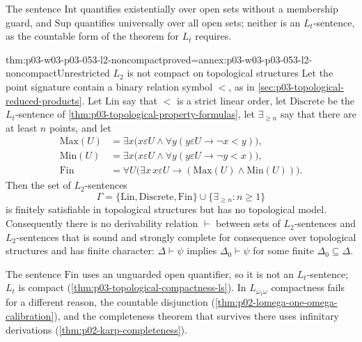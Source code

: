 The sentence \(\mathrm{Int}\) quantifies existentially over open sets
without a membership guard, and \(\mathrm{Sup}\) quantifies universally
over all open sets; neither is an \(L_t\)-sentence, as the countable form
of the theorem for \(L_t\) requires.

\begin{hbtheorem}{thm:p03-w03-p03-053-l2-noncompact}{proved=annex:p03-w03-p03-053-l2-noncompact}{Unrestricted \(L_2\) is not compact on topological structures}
Let the point signature contain a binary relation symbol \(<\), as in
\cref{sec:p03-topological-reduced-products}. Let \(\mathrm{Lin}\) say
that \(<\) is a strict linear order, let \(\mathrm{Discrete}\) be the
\(L_t\)-sentence of \cref{thm:p03-topological-property-formulas}, let
\(\exists_{\ge n}\) say that there are at least \(n\) points, and let
\[
\begin{aligned}
 \mathrm{Max}(U)&=\exists x\bigl(x\varepsilon U\land
                   \forall y(y\varepsilon U\to\neg x<y)\bigr),\\
 \mathrm{Min}(U)&=\exists x\bigl(x\varepsilon U\land
                   \forall y(y\varepsilon U\to\neg y<x)\bigr),\\
 \mathrm{Fin}&=\forall U\bigl(\exists x\,x\varepsilon U\to
                   (\mathrm{Max}(U)\land\mathrm{Min}(U))\bigr).
\end{aligned}
\]
Then the set of \(L_2\)-sentences
\[
 \Gamma=\{\mathrm{Lin},\mathrm{Discrete},\mathrm{Fin}\}\cup
        \{\exists_{\ge n}:n\ge1\}
\]
is finitely satisfiable in topological structures but has no
topological model.
Consequently there is no derivability relation \(\vdash\) between sets
of \(L_2\)-sentences and \(L_2\)-sentences that is sound and strongly
complete for consequence over topological structures and has finite
character: \(\Delta\vdash\psi\) implies \(\Delta_0\vdash\psi\) for some
finite \(\Delta_0\subseteq\Delta\).
\end{hbtheorem}

The sentence \(\mathrm{Fin}\) uses an unguarded open quantifier, so it is
not an \(L_t\)-sentence; \(L_t\) is compact
(\cref{thm:p03-topological-compactness-ls}). In \(L_{\omega_1\omega}\)
compactness fails for a different reason, the countable disjunction
(\cref{thm:p02-lomega-one-omega-calibration}), and the completeness
theorem that survives there uses infinitary derivations
(\cref{thm:p02-karp-completeness}).


